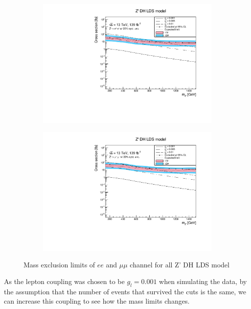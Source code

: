 \documentclass[12pt, a4paper]{book}
\begin{document}
\begin{figure}[!ht]
	\centering
   \begin{subfigure}[b]{0.49\textwidth}
      \centering
      \includegraphics[width=1\textwidth]{Limits/DH_LDS/mass_exclusion_ee.pdf}
      \end{subfigure}
   \hfill
   \begin{subfigure}[b]{0.49\textwidth}
      \centering
      \includegraphics[width=1\textwidth]{Limits/DH_LDS/mass_exclusion_uu.pdf}
      \end{subfigure}
   \caption{Mass exclusion limits of $ee$ and $\mu\mu$ channel for all Z' DH LDS model}\label{fig:DH_LDS_exclusion_ee_uu}
\end{figure}
As the lepton coupling was chosen to be $g_l=0.001$ when simulating the data, by the assumption that the number of events that survived the cuts is the same, we can increase this coupling to see how the mass limits changes.
\end{document}
